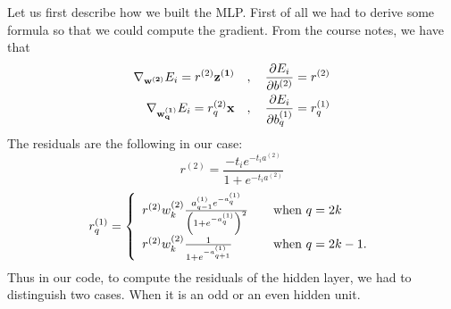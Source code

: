 \documentclass[10pt,a4paper,english]{article}
\begin{document}
Let us first describe how we built the MLP.
First of all we had to derive some formula so that we could compute the gradient.
From the course notes, we have that
\[
    \begin{split}
        \nabla_{\bf w^{(2)}}E_i = r^{(2)} {\bf z^{(1)}} \quad,\quad \frac{\partial E_i}{\partial b^{(2)}}  = r^{(2)}\\
 \nabla_{\bf w_q^{(1)}}E_i = r_q^{(2)} {\bf x} \quad, \quad \frac{\partial E_i}{\partial b_q^{(1)}}  = r_q^{(1)}\\
    \end{split}
\]
The residuals are the following in our case:
\[
        r^{(2)} = \frac{-t_i e^{-t_i a^{(2)}}}{1 + e^{-t_i a^{(2)}}}
\]
\[
        r_q^{(1)} = \left\{
            \begin{array}{l l}
                r^{(2)} w_k^{(2)}\frac{a_{q-1}^{(1)} e^{-a_{q}^{(1)}}}{\left(1+e^{-a_{q}^{(1)}}\right)^2} & \quad\mbox{when } q = 2k\\
                r^{(2)} w_k^{(2)}\frac{1}{1 + e^{-a_{q+1}^{(1)}}} & \quad\mbox{when } q = 2k-1.\\
        \end{array}\right.
\]
Thus in our code, to compute the residuals of the hidden layer, we had to distinguish two cases. When it is an odd or an even hidden unit.
\end{document}
